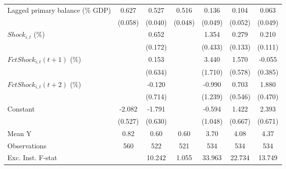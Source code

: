 {\begin{tabular}{l*{6}{c}}
\addlinespace
Lagged primary balance (\% GDP)&       0.627\sym{***}&       0.527\sym{***}&       0.516\sym{***}&       0.136\sym{***}&       0.104\sym{*}  &       0.063         \\
                    &     (0.058)         &     (0.040)         &     (0.048)         &     (0.049)         &     (0.052)         &     (0.049)         \\
\addlinespace
$ Shock_{i,t}$ (\%) &                     &       0.652\sym{***}&                     &       1.354\sym{***}&       0.279\sym{**} &       0.210\sym{*}  \\
                    &                     &     (0.172)         &                     &     (0.433)         &     (0.133)         &     (0.111)         \\
\addlinespace
$ FctShock_{i,t}(t+1)$ (\%)&                     &       0.153         &                     &       3.440\sym{*}  &       1.570\sym{**} &      -0.055         \\
                    &                     &     (0.634)         &                     &     (1.710)         &     (0.578)         &     (0.385)         \\
\addlinespace
$ FctShock_{i,t}(t+2)$ (\%)&                     &      -0.120         &                     &      -0.990         &       0.703         &       1.880\sym{***}\\
                    &                     &     (0.714)         &                     &     (1.239)         &     (0.546)         &     (0.470)         \\
\addlinespace
Constant            &      -2.082\sym{***}&      -1.791\sym{***}&                     &      -0.594         &       1.422\sym{**} &       2.393\sym{***}\\
                    &     (0.527)         &     (0.630)         &                     &     (1.048)         &     (0.667)         &     (0.671)         \\
\midrule
Mean Y              &        0.82         &        0.60         &        0.60         &        3.70         &        4.08         &        4.37         \\
Observations        &         560         &         522         &         521         &         534         &         534         &         534         \\
Exc. Inst. F-stat   &                     &      10.242         &       1.055         &      33.963         &      22.734         &      13.749         \\
\bottomrule
\end{tabular}
}
